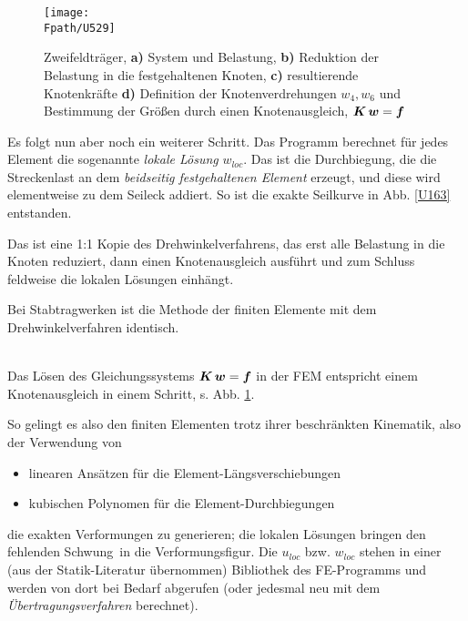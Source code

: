 \begin{figure}[tbp] \centering
\centering
\if {} \sidecaption[t] \fi
\texttt{[image: \\Fpath/U529]}
\caption{Zweifeldtr\"{a}ger,  \textbf{a)} System und Belastung, \textbf{ b)} Reduktion der Belastung in die festgehaltenen Knoten, \textbf{ c)} resultierende Knotenkr\"{a}fte \textbf{ d)} Definition der Knotenverdrehungen $w_4, w_6$ und Bestimmung der Gr\"{o}{\ss}en durch einen Knotenausgleich, $\mbox{\boldmath $K$}\,\mbox{\boldmath $w$} = \mbox{\boldmath $f$}$} \label{U529}
\end{figure}%
Es folgt nun aber noch ein weiterer Schritt. Das Programm berechnet f\"{u}r jedes Element die sogenannte {\em lokale L\"{o}sung\/} $w_{loc}$. Das ist die Durchbiegung, die die Streckenlast an dem {\em beidseitig festgehaltenen Element\/} erzeugt, und diese wird elementweise zu dem Seileck addiert. So ist die exakte Seilkurve in Abb. \ref{U163} entstanden.

Das ist eine 1:1 Kopie des Drehwinkelverfahrens, das erst alle Belastung in die Knoten reduziert, dann einen Knotenausgleich ausf\"{u}hrt und zum Schluss feldweise die lokalen L\"{o}sungen einh\"{a}ngt.\\

\hspace*{-12pt}\colorbox{highlightBlue}{\parbox{0.98\textwidth}{ Bei Stabtragwerken ist die Methode der finiten Elemente mit dem Drehwinkelverfahren identisch. }}\\

Das L\"{o}sen des Gleichungssystems $\mbox{\boldmath $K$}\,\mbox{\boldmath $w$} = \mbox{\boldmath $f$}$ in der FEM entspricht einem Knotenausgleich in einem Schritt, s. Abb. \ref{U529}.

So gelingt es also den finiten Elementen trotz ihrer beschr\"{a}nkten Kinematik, also der Verwendung von
\begin{itemize}
  \item linearen Ans\"{a}tzen f\"{u}r die Element-L\"{a}ngsverschiebungen
  \item kubischen Polynomen f\"{u}r die Element-Durchbiegungen
\end{itemize}
die exakten Verformungen zu generieren; die lokalen L\"{o}sungen bringen den fehlenden \glq Schwung\grq\ in die Verformungsfigur. Die $u_{loc}$ bzw. $w_{loc}$ stehen in einer (aus der Statik-Literatur \"{u}bernommen) Bibliothek des FE-Programms und werden von dort bei Bedarf abgerufen (oder jedesmal neu mit dem {\em \"{U}bertragungsverfahren\/} berechnet).

